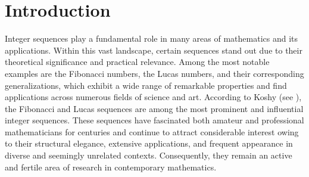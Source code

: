 \documentclass[11pt]{birkjour}
\theoremstyle{definition}
\theoremstyle{remark}
\numberwithin{equation}{section}
\begin{document}
\date{January 10, 2026}
\begin{abstract}
In this paper, we study a structured family of matrices whose entries are given by products of $k$-Fibonacci and $k$-Lucas numbers. For this family, we obtain explicit and unified formulas for several classical matrix invariants, including the determinant, inverse, trace, and matrix powers, revealing nontrivial algebraic patterns induced by the underlying recurrence relations. In addition, we determine the spectral radius and the energy of the graphs naturally associated with these matrices. Finally, we establish connections between the resulting formulas and certain integer sequences recorded in the On-Line Encyclopedia of Integer Sequences (OEIS).
\end{abstract}
\maketitle
\section{Introduction}

\noindent Integer sequences play a fundamental role in many areas of mathematics and its applications. Within this vast landscape, certain sequences stand out due to their theoretical significance and practical relevance. Among the most notable examples are the Fibonacci numbers, the Lucas numbers, and their corresponding generalizations, which exhibit a wide range of remarkable properties and find applications across numerous fields of science and art. According to Koshy (see \cite{koshy}), the Fibonacci and Lucas sequences are among the most prominent and influential integer sequences. These sequences have fascinated both amateur and professional mathematicians for centuries and continue to attract considerable interest owing to their structural elegance, extensive applications, and frequent appearance in diverse and seemingly unrelated contexts. Consequently, they remain an active and fertile area of research in contemporary mathematics.
\par\smallskip
\end{document}
